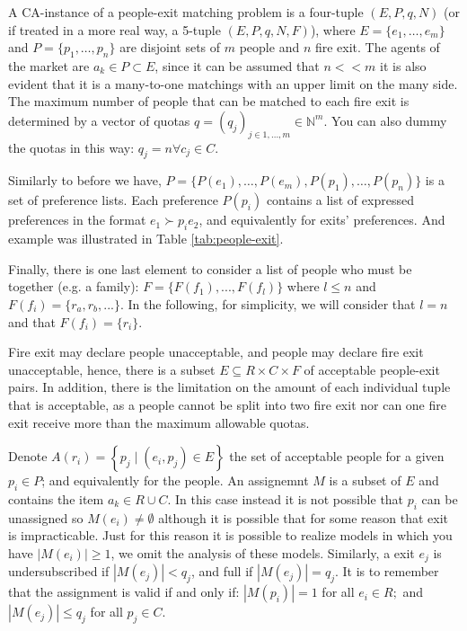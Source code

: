 \documentclass[letterpaper]{article} %
\begin{document}
    A CA-instance of a people-exit matching problem is a four-tuple \((E, P, q, N)\)
    (or if treated in a more real way, a 5-tuple \((E, P, q, N, F)\)), where
    \(E = \{e_1, \dots, e_m\}\) and \(P = \{p_1, \dots,p_n\}\) are disjoint sets of \(m\) people and \(n\) fire exit.
    The agents of the market are \(a_k \in P\subset E\),
    since it can be assumed that \(n << m\) it is also evident that it is a many-to-one matchings with an upper limit on the many side.
    The maximum number of people that can be matched to
    each fire exit is determined by a vector of quotas \(q = (q_j)_{j\in {1,...,m}} \in \mathbb{N}^m\).
    You can also dummy the quotas in this way:  \(q_j = n \forall c_j \in C\).

    Similarly to before we have, \(P = \{P(e_1), \dots , P(e_m), P(p_1), \dots , P(p_n)\}\) is
    a set of preference lists.
    Each preference \(P(p_i)\) contains a list of expressed preferences in the format \( e _ { 1 } \succ p _ { i } e _ { 2 } \),
    and equivalently for exits' preferences.
    And example was illustrated in Table \ref{tab:people-exit}.

    Finally, there is one last element to consider a list of people who must be together (e.g. a family): \(F=\{F(f_1), ..., F(f_l)\}\) where \(l\leq n\) and \(F(f_i) = \{r_a, r_b, ...\}\).
    In the following, for simplicity, we will consider that \(l=n\) and that \(F(f_i)=\{r_i\}\).

    Fire exit may declare people unacceptable, and people may declare fire exit unacceptable,
    hence, there is a subset \(E \subseteq R \times C \times F\) of acceptable people-exit pairs.
    In addition, there is the limitation on the amount of each individual tuple that is acceptable, as a people cannot be split into two fire exit nor can one fire exit receive more than the maximum allowable quotas.

    Denote \( A \left( r _ { i } \right) = \left\{ p _ { j } \mid \left( e _ { i } , p _ { j } \right) \in E \right\} \)
    the set of acceptable people for a given \( p _ { i } \in P \); and equivalently for the people.
    An assignemnt \(M\) is a subset of \(E\) and contains the item \( a _ { k } \in R \cup C \). In this case instead it is not possible that \( p _ { i } \) can be unassigned so \( M \left( e _ { i } \right) \neq \emptyset \) although it is possible that for some reason that exit is impracticable.
    Just for this reason it is possible to realize models in which you have \(|M \left( e _ { i } \right)| \geq 1\), we omit the analysis of these models.
    Similarly, a exit \( e _ { j } \) is
    undersubscribed if \( \left| M \left( e _ { j } \right) \right| < q _ { j } \), and full if \( \left| M \left( e _ { j } \right) \right| = q _ { j } \).
    It is to remember that the assignment is valid if and only if:
    \( \left| M \left( p _ { i } \right) \right| = 1 \) for all \( e _ { i } \in R ; \) and
    \( \left| M \left( e _ { j } \right) \right| \leq q _ { j } \) for all \( p _ { j } \in C  \).
\end{document}

